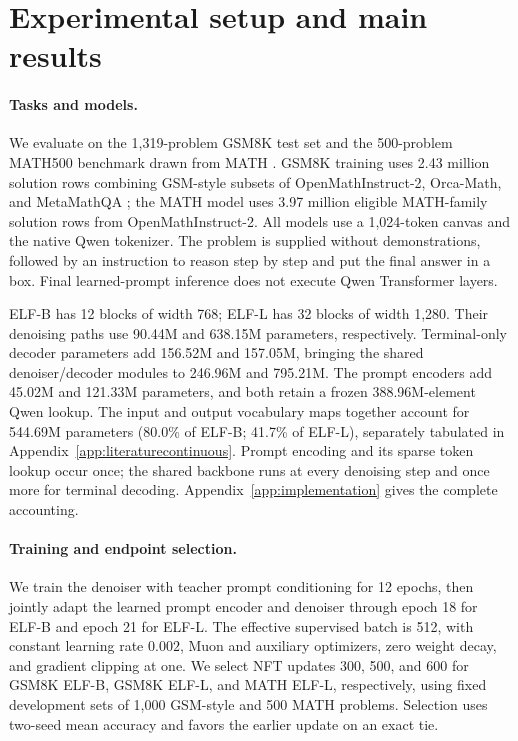 \section{Experimental setup and main results}
\label{sec:experiments}
\paragraph{Tasks and models.}
We evaluate on the 1,319-problem GSM8K test set \citep{gsm8k} and the 500-problem MATH500 benchmark drawn from MATH \citep{math,math500}. GSM8K training uses 2.43 million solution rows combining GSM-style subsets of OpenMathInstruct-2, Orca-Math, and MetaMathQA \citep{openmath,orcamath,metamath}; the MATH model uses 3.97 million eligible MATH-family solution rows from OpenMathInstruct-2. All models use a 1,024-token canvas and the native Qwen tokenizer. The problem is supplied without demonstrations, followed by an instruction to reason step by step and put the final answer in a box. Final learned-prompt inference does not execute Qwen Transformer layers.

ELF-B has 12 blocks of width 768; ELF-L has 32 blocks of width 1,280. Their denoising paths use 90.44M and 638.15M parameters, respectively. Terminal-only decoder parameters add 156.52M and 157.05M, bringing the shared denoiser/decoder modules to 246.96M and 795.21M. The prompt encoders add 45.02M and 121.33M parameters, and both retain a frozen 388.96M-element Qwen lookup. The input and output vocabulary maps together account for 544.69M parameters (80.0\% of ELF-B; 41.7\% of ELF-L), separately tabulated in Appendix~\ref{app:literaturecontinuous}. Prompt encoding and its sparse token lookup occur once; the shared backbone runs at every denoising step and once more for terminal decoding. Appendix~\ref{app:implementation} gives the complete accounting.

\paragraph{Training and endpoint selection.}
We train the denoiser with teacher prompt conditioning for 12 epochs, then jointly adapt the learned prompt encoder and denoiser through epoch 18 for ELF-B and epoch 21 for ELF-L. The effective supervised batch is 512, with constant learning rate $0.002$, Muon and auxiliary optimizers, zero weight decay, and gradient clipping at one. We select NFT updates 300, 500, and 600 for GSM8K ELF-B, GSM8K ELF-L, and MATH ELF-L, respectively, using fixed development sets of 1,000 GSM-style and 500 MATH problems. Selection uses two-seed mean accuracy and favors the earlier update on an exact tie.

